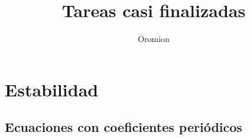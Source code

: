 \documentclass{oromion}
\title{Tareas casi finalizadas}
\subtitle[Curso Básico de \LaTeX{}]
\author{Oromion}
\begin{document}
\maketitle

\section{Estabilidad}
\lipsum[1-5]
\subsection{Ecuaciones con coeficientes periódicos}
\lipsum[6-10]
\end{document}
